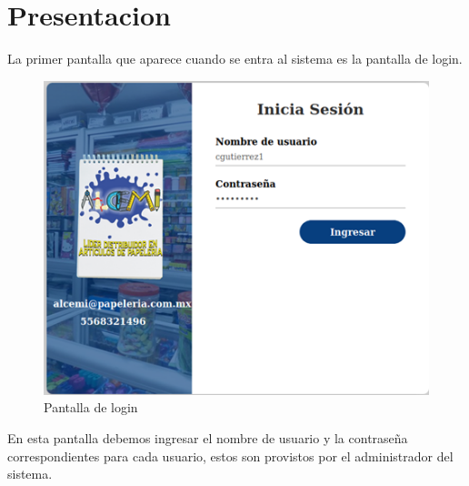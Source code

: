 \documentclass{article}
\begin{document}
\section{Presentacion}

La primer pantalla que aparece cuando se entra al sistema es la pantalla de login.\\

\begin{figure}[h]
\caption {Pantalla de login}
\centering
\includegraphics[scale=1]{fig3}
\end{figure}

En esta pantalla debemos ingresar el nombre de usuario y la contraseña correspondientes para cada usuario, estos son provistos por el administrador del sistema.\\

\pagebreak
\end{document}
